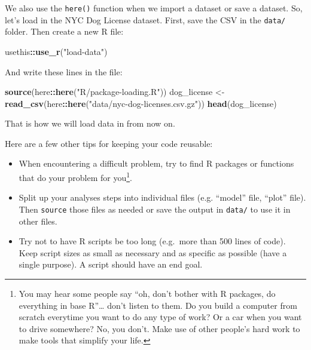 \documentclass[]{Nemilov}
\newenvironment{Shaded}{\begin{snugshade}}{\end{snugshade}}
\newcommand{\KeywordTok}[1]{\textcolor[rgb]{0.13,0.29,0.53}{\textbf{#1}}}
\newcommand{\NormalTok}[1]{#1}
\newcommand{\OperatorTok}[1]{\textcolor[rgb]{0.81,0.36,0.00}{\textbf{#1}}}
\newcommand{\StringTok}[1]{\textcolor[rgb]{0.31,0.60,0.02}{#1}}
\providecommand{\tightlist}{%
  \setlength{\itemsep}{0pt}\setlength{\parskip}{0pt}}
\begin{document}
We also use the \texttt{here()} function when we import a dataset or save a dataset.
So, let's load in the NYC Dog License dataset. First, save the CSV in the
\texttt{data/} folder. Then create a new R file:

\begin{Shaded}
\begin{Highlighting}[]
\NormalTok{usethis}\OperatorTok{::}\KeywordTok{use_r}\NormalTok{(}\StringTok{"load-data"}\NormalTok{)}
\end{Highlighting}
\end{Shaded}

And write these lines in the file:

\begin{Shaded}
\begin{Highlighting}[]
\KeywordTok{source}\NormalTok{(here}\OperatorTok{::}\KeywordTok{here}\NormalTok{(}\StringTok{"R/package-loading.R"}\NormalTok{))}
\NormalTok{dog_license <-}\StringTok{ }\KeywordTok{read_csv}\NormalTok{(here}\OperatorTok{::}\KeywordTok{here}\NormalTok{(}\StringTok{"data/nyc-dog-licenses.csv.gz"}\NormalTok{))}
\KeywordTok{head}\NormalTok{(dog_license)}
\end{Highlighting}
\end{Shaded}

That is how we will load data in from now on.

Here are a few other tips for keeping your code reusable:

\begin{itemize}
\tightlist
\item
  When encountering a difficult problem, try
  to find R packages or functions that do your problem for you\footnote{You may hear some people say ``oh, don't bother with R
    packages, do everything in base R''\ldots{} don't listen to them. Do you build a
    computer from scratch everytime you want to do any type of work? Or a car when
    you want to drive somewhere? No, you don't. Make use of other people's hard work
    to make tools that simplify your life.}.
\item
  Split up your analyses steps into individual files (e.g. ``model'' file, ``plot''
  file). Then \texttt{source} those files as needed or save the output in \texttt{data/} to use
  it in other files.
\item
  Try not to have R scripts be too long (e.g.~more than 500 lines of code). Keep
  script sizes as small as necessary and as specific as possible (have a single
  purpose). A script should have an end goal.
\end{itemize}
\end{document}
